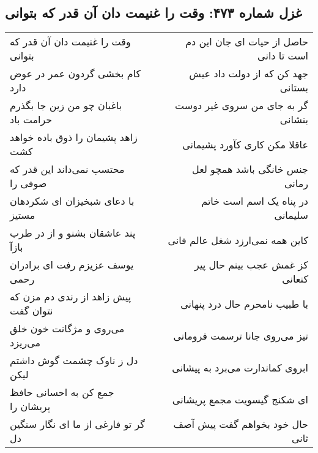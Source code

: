 \begin{center}
\section*{غزل شماره ۴۷۳: وقت را غنیمت دان آن قدر که بتوانی}
\label{sec:sh473}
\begin{longtable}{l p{0.5cm} r}
وقت را غنیمت دان آن قدر که بتوانی
&&
حاصل از حیات ای جان این دم است تا دانی
\\
کام بخشی گردون عمر در عوض دارد
&&
جهد کن که از دولت داد عیش بستانی
\\
باغبان چو من زین جا بگذرم حرامت باد
&&
گر به جای من سروی غیر دوست بنشانی
\\
زاهد پشیمان را ذوق باده خواهد کشت
&&
عاقلا مکن کاری کآورد پشیمانی
\\
محتسب نمی‌داند این قدر که صوفی را
&&
جنس خانگی باشد همچو لعل رمانی
\\
با دعای شبخیزان ای شکردهان مستیز
&&
در پناه یک اسم است خاتم سلیمانی
\\
پند عاشقان بشنو و از در طرب بازآ
&&
کاین همه نمی‌ارزد شغل عالم فانی
\\
یوسف عزیزم رفت ای برادران رحمی
&&
کز غمش عجب بینم حال پیر کنعانی
\\
پیش زاهد از رندی دم مزن که نتوان گفت
&&
با طبیب نامحرم حال درد پنهانی
\\
می‌روی و مژگانت خون خلق می‌ریزد
&&
تیز می‌روی جانا ترسمت فرومانی
\\
دل ز ناوک چشمت گوش داشتم لیکن
&&
ابروی کماندارت می‌برد به پیشانی
\\
جمع کن به احسانی حافظ پریشان را
&&
ای شکنج گیسویت مجمع پریشانی
\\
گر تو فارغی از ما ای نگار سنگین دل
&&
حال خود بخواهم گفت پیش آصف ثانی
\\
\end{longtable}
\end{center}
